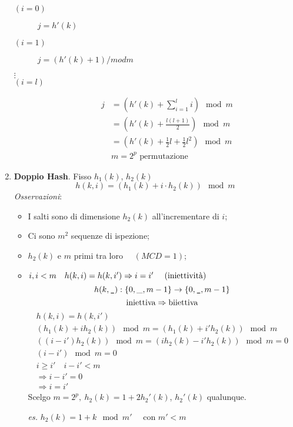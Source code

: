 \begin{enumerate}
    \begin{description}
        \item[$(i=0) \quad$] $j = h'(k)$
        \item[$(i=1) \quad$] $j = (h'(k)+1) /mod m$
        \item[$\vdots$] 
        \item[$(i=l) \quad$] 
        \begin{align*}
            j & = \left( h'(k) + \displaystyle\sum_{i=1}^{l}i \right) \mod m \\
            & = \left( h'(k) + \frac{l(l+1)}{2} \right) \mod m \\
            & = \left( h'(k) + \frac{1}{2}l + \frac{1}{2}l^2 \right) \mod m \\
            & m = 2^p \text{ permutazione}
        \end{align*}
    \end{description}
    \item \textbf{Doppio Hash}. Fisso $h_1(k)$, $h_2(k)$
    $$h(k,i) = (h_1(k) + i \cdot h_2(k)) \mod m$$
    \emph{Osservazioni}:
    \begin{itemize}
        \item I salti sono di dimensione $h_2(k)$ all'incrementare di $i$; 
        \item Ci sono $m^2$ sequenze di ispezione;
        \item $h_2(k)$ e $m$ primi tra loro $ \quad (MCD = 1)$;
        \item $i, i<m \quad h(k,i) = h(k,i') \Rightarrow i = i' \ \quad (\text{\emph{iniettività}})$
        $$h(k, \verb|_|) : \{ 0, \_, m-1 \} \rightarrow \{ 0,\verb|_|, m-1 \}$$
        $$\text{\emph{iniettiva}} \Rightarrow \text{\emph{biiettiva}}$$
        \begin{gather*}
            h(k,i) = h(k,i') \\
            (h_1(k) + ih_2(k)) \mod m = (h_1(k) + i'h_2(k)) \mod m \\
            ((i - i')h_2(k)) \mod m = (i h_2(k) - i'h_2(k)) \mod m = 0 \\
            (i - i') \mod m = 0 \\
            i \geq i' \quad i - i' < m \\ 
            \Rightarrow i - i' = 0 \\
            \Rightarrow i = i'
        \end{gather*}
        Scelgo $m = 2^p, \ h_2(k) = 1 + 2h_2'(k)$, $h_2'(k)$ qualunque.\par
        \emph{es.} $h_2(k) = 1 + k \mod m' \quad$ con $m' < m$
    \end{itemize}
    \end{enumerate}

